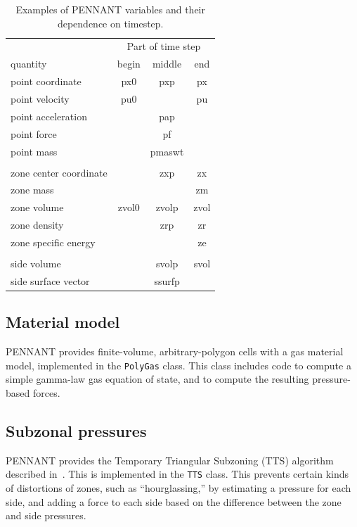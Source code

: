 \documentclass[11pt,letterpaper]{article}
\begin{document}
\begin{table}
\centering
\caption{Examples of PENNANT variables and their dependence on timestep.}
\label{tbl:timestep}
\begin{tabular}{lccc}
    \hline
    & \multicolumn{3}{c}{Part of time step} \\
    quantity & begin & middle & end \\
    \hline
    point coordinate       & px0   & pxp     & px \\
    point velocity         & pu0   &         & pu \\
    point acceleration     &       & pap \\
    point force            &       & pf \\
    point mass             &       & pmaswt \\
    \\
    zone center coordinate &       & zxp     & zx \\
    zone mass              &       &         & zm \\
    zone volume            & zvol0 & zvolp   & zvol \\
    zone density           &       & zrp     & zr \\
    zone specific energy   &       &         & ze \\
    \\
    side volume            &       & svolp   & svol \\
    side surface vector    &       & ssurfp \\
    \hline
\end{tabular}
\end{table}

\subsection{Material model}

PENNANT provides finite-volume, arbitrary-polygon cells with a
gas material model, implemented in the {\tt PolyGas} class.
This class includes code to compute a simple gamma-law gas
equation of state, and to compute the resulting pressure-based
forces.

\subsection{Subzonal pressures}

PENNANT provides the Temporary Triangular Subzoning (TTS) algorithm
described in~\cite{szp,tts}.  This is implemented in the {\tt TTS}
class.  This prevents certain kinds of distortions of zones, such as
``hourglassing,'' by estimating a pressure for each side, and adding
a force to each side based on the difference
between the zone and side pressures.
\end{document}
